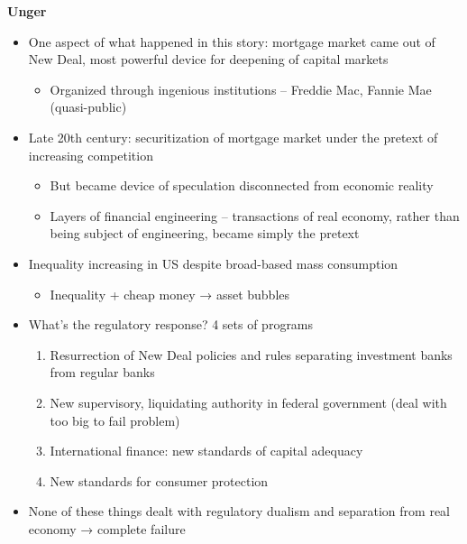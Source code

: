 \textbf{Unger}

\begin{itemize}
\tightlist
\item
  One aspect of what happened in this story: mortgage market came out of
  New Deal, most powerful device for deepening of capital markets

  \begin{itemize}
  \tightlist
  \item
    Organized through ingenious institutions -- Freddie Mac, Fannie Mae
    (quasi-public)
  \end{itemize}
\item
  Late 20th century: securitization of mortgage market under the pretext
  of increasing competition

  \begin{itemize}
  \tightlist
  \item
    But became device of speculation disconnected from economic reality
  \item
    Layers of financial engineering -- transactions of real economy,
    rather than being subject of engineering, became simply the pretext
  \end{itemize}
\item
  Inequality increasing in US despite broad-based mass consumption

  \begin{itemize}
  \tightlist
  \item
    Inequality + cheap money → asset bubbles
  \end{itemize}
\item
  What's the regulatory response? 4 sets of programs

  \begin{enumerate}
  \def\labelenumi{\arabic{enumi}.}
  \tightlist
  \item
    Resurrection of New Deal policies and rules separating investment
    banks from regular banks
  \item
    New supervisory, liquidating authority in federal government (deal
    with too big to fail problem)
  \item
    International finance: new standards of capital adequacy
  \item
    New standards for consumer protection
  \end{enumerate}
\item
  None of these things dealt with regulatory dualism and separation from
  real economy → complete failure


\end{itemize}
